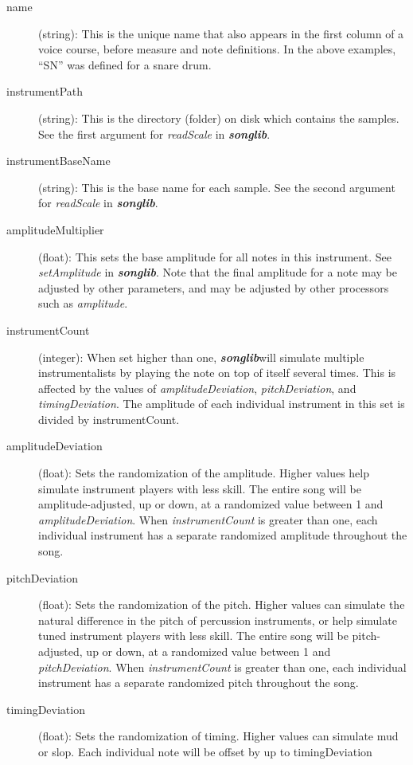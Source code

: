 \documentclass{article}
\newcommand\songlib {{\it\bf songlib}}
\begin{document}
\begin{description}
\item[name] (string):
    This is the unique name that also appears in the first column
    of a voice course, before measure and note definitions.  In the above
    examples, ``SN'' was defined for a snare drum.
\item[instrumentPath] (string): 
    This is the directory (folder) on disk which contains the samples.
    See the first argument for {\it readScale} in \songlib.
\item[instrumentBaseName] (string):
    This is the base name for each sample.  See the second argument
    for {\it readScale} in \songlib.
\item[amplitudeMultiplier] (float):
    This sets the base amplitude for all notes in this instrument.
    See {\it setAmplitude} in \songlib.  Note that the final amplitude
    for a note may be adjusted by other parameters, and may be adjusted by other
    processors such as {\it amplitude}.
\item[instrumentCount] (integer):
    When set higher than one, \songlib will simulate multiple
    instrumentalists by playing the note on top of itself several times.
    This is affected by the values of {\it amplitudeDeviation}, {\it
    pitchDeviation}, and {\it timingDeviation}.  The amplitude of each
    individual instrument in this set is divided by instrumentCount.
\item[amplitudeDeviation] (float):
    Sets the randomization of the amplitude.  Higher values help
    simulate instrument players with less skill.  The entire song will be
    amplitude-adjusted, up or down, at a randomized value between 1 and
    {\it amplitudeDeviation}.  When {\it instrumentCount} is greater than
    one, each individual instrument has a separate randomized amplitude
    throughout the song.
\item[pitchDeviation] (float):
    Sets the randomization of the pitch.  Higher values can simulate the
    natural difference in the pitch of percussion instruments, or help
    simulate tuned instrument players with less skill.  The entire song
    will be pitch-adjusted, up or down, at a randomized value between
    1 and {\it pitchDeviation}.  When {\it instrumentCount} is greater
    than one, each individual instrument has a separate randomized pitch
    throughout the song.
\item[timingDeviation] (float):
    Sets the randomization of timing.  Higher values can simulate mud
    or slop.  Each individual note will be offset by up to timingDeviation

\end{description}
\end{document}

